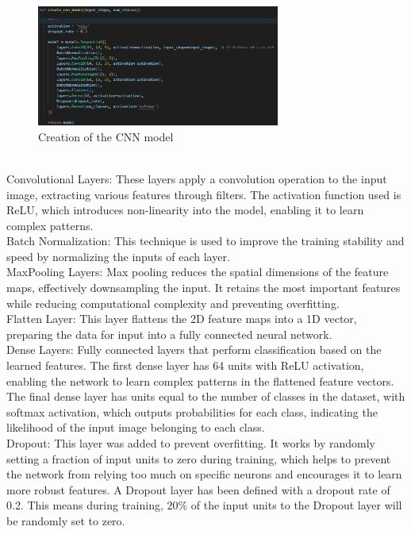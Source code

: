 \documentclass{article}
\begin{document}
\begin{figure}[H]
    \caption{Creation of the CNN model}
    \centering
    \includegraphics[width=8cm]{../imgFolder/create_cnn_model.png}
\end{figure}
\text{ }\\
Convolutional Layers: These layers apply a convolution operation to the input image,
extracting various features through filters.
The activation function used is ReLU,
which introduces non-linearity into the model, enabling it to learn complex patterns.\\\newline
Batch Normalization: This technique is used to improve the training stability and speed
by normalizing the inputs of each layer.\\\newline
MaxPooling Layers: Max pooling reduces the spatial dimensions of the feature maps,
effectively downsampling the input.
It retains the most important features while reducing computational
complexity and preventing overfitting.\\\newline
Flatten Layer: This layer flattens the 2D feature maps into a 1D vector,
preparing the data for input into a fully connected neural network.\\\newline
Dense Layers: Fully connected layers that perform classification based on the learned features.
The first dense layer has 64 units with ReLU activation, enabling the network to learn complex
patterns in the flattened feature vectors.
The final dense layer has units equal to the number of classes
in the dataset, with softmax activation, which outputs probabilities for each class,
indicating the likelihood of the input image belonging to each class.\\\newline
Dropout: This layer was added to prevent overfitting.
It works by randomly setting a fraction of input units to zero during training,
which helps to prevent the network from relying too much on specific neurons
and encourages it to learn more robust features.
A Dropout layer has been defined with a dropout rate of 0.2.
This means during training, ${20\%}$ of the input units to the Dropout layer will be randomly set to zero.\\\newline
\end{document}
